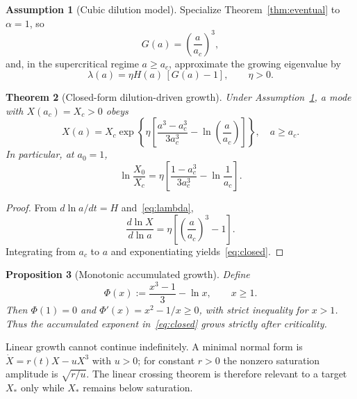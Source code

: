 \documentclass[11pt]{article}
\newtheorem{theorem}{Theorem}[section]
\newtheorem{proposition}[theorem]{Proposition}
\theoremstyle{definition}
\newtheorem{assumption}[theorem]{Assumption}
\theoremstyle{remark}
\begin{document}
\begin{assumption}[Cubic dilution model]
\label{ass:cubic}
Specialize Theorem~\ref{thm:eventual} to $\alpha=1$, so
\begin{equation}
\label{eq:G}
G(a)=\left(\frac{a}{a_c}\right)^3,
\end{equation}
and, in the supercritical regime $a\ge a_c$, approximate the growing eigenvalue by
\begin{equation}
\label{eq:lambda}
\lambda(a)=\eta H(a)\,[G(a)-1],\qquad \eta>0.
\end{equation}
\end{assumption}

\begin{theorem}[Closed-form dilution-driven growth]
\label{thm:closed}
Under Assumption~\ref{ass:cubic}, a mode with $X(a_c)=X_c>0$ obeys
\begin{equation}
\label{eq:closed}
\boxed{
X(a)=X_c\exp\!\left\{\eta\left[
\frac{a^3-a_c^3}{3a_c^3}-\ln\!\left(\frac{a}{a_c}\right)
\right]\right\},\quad a\ge a_c.}
\end{equation}
In particular, at $a_0=1$,
\begin{equation}
\label{eq:today}
\ln\frac{X_0}{X_c}=\eta\left[
\frac{1-a_c^3}{3a_c^3}-\ln\frac1{a_c}
\right].
\end{equation}
\end{theorem}

\begin{proof}
From $d\ln a/dt=H$ and~\eqref{eq:lambda},
\[
\frac{d\ln X}{d\ln a}=\eta\left[\left(\frac a{a_c}\right)^3-1\right].
\]
Integrating from $a_c$ to $a$ and exponentiating yields~\eqref{eq:closed}.
\end{proof}

\begin{proposition}[Monotonic accumulated growth]
\label{prop:Phi}
Define
\begin{equation}
\Phi(x):=\frac{x^3-1}{3}-\ln x,\qquad x\ge1.
\end{equation}
Then $\Phi(1)=0$ and $\Phi'(x)=x^2-1/x\ge0$, with strict inequality for $x>1$.
Thus the accumulated exponent in~\eqref{eq:closed} grows strictly after criticality.
\end{proposition}

Linear growth cannot continue indefinitely.
A minimal normal form is $\dot X=r(t)X-uX^3$ with $u>0$; for constant $r>0$ the nonzero saturation amplitude is $\sqrt{r/u}$.
The linear crossing theorem is therefore relevant to a target $X_*$ only while $X_*$ remains below saturation.
\end{document}
